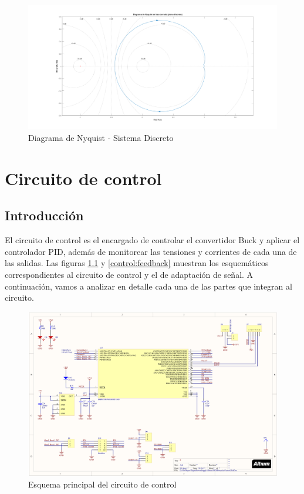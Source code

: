 \documentclass[12pt]{report}
\begin{document}
	\begin{figure}
		\centering
		\includegraphics[width=\textwidth,height=\textheight,keepaspectratio]{buck_nyquist_discrete} 
		\caption{Diagrama de Nyquist - Sistema Discreto}
		\label{buck:nyquist_discrete}
	\end{figure}
	
\chapter{Circuito de control}

\section{Introducción}

El circuito de control es el encargado de controlar el convertidor Buck y aplicar el controlador PID, además de monitorear las tensiones y corrientes de cada una de las salidas. Las figuras \ref{control:main} y \ref{control:feedback} muestran los esquemáticos correspondientes al circuito de control y el de adaptación de señal. A continuación, vamos a analizar en detalle cada una de las partes que integran al circuito.

\begin{figure}
	\centering
	\includegraphics[width=\textwidth,height=\textheight,keepaspectratio]{sch_control_main} 
	\caption{Esquema principal del circuito de control}
	\label{control:main}
\end{figure}
\end{document}
